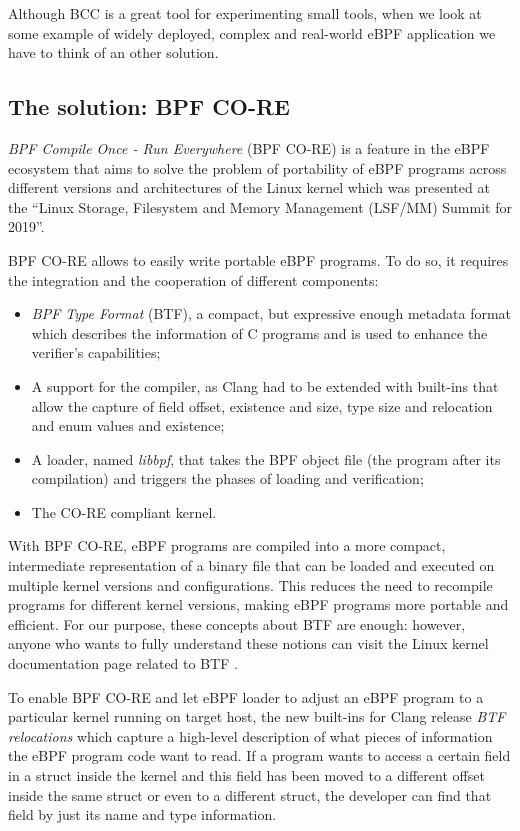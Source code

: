 Although BCC is a great tool for experimenting small tools, when we look at some example of widely deployed, complex and real-world eBPF application we have to think of an other solution.

\subsection{The solution: BPF CO-RE}

\textit{BPF Compile Once - Run Everywhere} (BPF CO-RE) is a feature in the eBPF ecosystem that aims to solve the problem of portability of eBPF programs across different versions and architectures of the Linux kernel which was presented at the ``Linux Storage, Filesystem and Memory Management (LSF/MM) Summit for 2019''.

BPF CO-RE allows to easily write portable eBPF programs.
To do so, it requires the integration and the cooperation of different components:

\begin{itemize}
	\item \textit{BPF Type Format} (BTF), a compact, but expressive enough metadata
		format which describes the information of C programs and is used to enhance the verifier's capabilities;
	\item A support for the compiler, as Clang  had to be extended with built-ins that
		allow the capture of field offset, existence and size, type size and relocation and enum values and existence;
	\item A loader, named \textit{libbpf}, that takes the BPF object file (the program
		after its compilation) and triggers the phases of loading and verification;
	\item The CO-RE compliant kernel.
\end{itemize}

With BPF CO-RE, eBPF programs are compiled into a more compact, intermediate representation of a binary file that can be loaded and executed on multiple kernel versions and configurations.
This reduces the need to recompile programs for different kernel versions, making eBPF programs more portable and efficient. 
For our purpose, these concepts about BTF are enough: however, anyone who wants to fully understand these notions can visit the Linux kernel documentation page related to BTF \cite{BTFKernelDoc}.

To enable BPF CO-RE and let eBPF loader to adjust an eBPF program to a particular kernel running on target host, the new built-ins for Clang release \textit{BTF relocations} which capture a high-level description of what pieces of information the eBPF program code want to read.
If a program wants to access a certain field in a struct inside the kernel and this field has been moved to a different offset inside the same struct or even to a different struct, the developer can find that field by just its name and type information.

